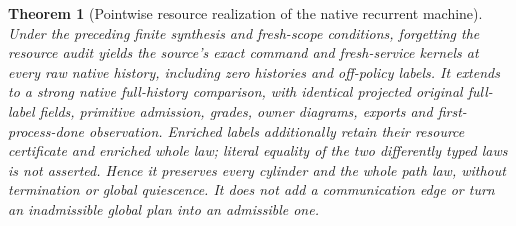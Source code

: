 \documentclass[11pt]{article}
\newtheorem{theorem}{Theorem}\newtheorem{proposition}{Proposition}\newtheorem{corollary}{Corollary}
\begin{document}
\begin{theorem}[Pointwise resource realization of the native recurrent machine]\label{thm:assembly}
Under the preceding finite synthesis and fresh-scope conditions, forgetting the resource audit yields the source's exact command and fresh-service kernels at every raw native history, including zero histories and off-policy labels. It extends to a strong native full-history comparison, with identical projected original full-label fields, primitive admission, grades, owner diagrams, exports and first-process-done observation. Enriched labels additionally retain their resource certificate and enriched whole law; literal equality of the two differently typed laws is not asserted. Hence it preserves every cylinder and the whole path law, without termination or global quiescence. It does not add a communication edge or turn an inadmissible global plan into an admissible one.
\end{theorem}
\end{document}
